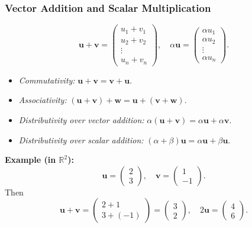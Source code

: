 \subsubsection{Vector Addition and Scalar Multiplication}
\[
\mathbf{u} + \mathbf{v} =
\begin{pmatrix}
u_1 + v_1 \\
u_2 + v_2 \\
\vdots \\
u_n + v_n
\end{pmatrix},
\quad
\alpha \mathbf{u} =
\begin{pmatrix}
\alpha u_1 \\
\alpha u_2 \\
\vdots \\
\alpha u_n
\end{pmatrix}.
\]
\begin{itemize}
\item \emph{Commutativity:} $\mathbf{u} + \mathbf{v} = \mathbf{v} + \mathbf{u}$.
\item \emph{Associativity:} $(\mathbf{u} + \mathbf{v}) + \mathbf{w} = \mathbf{u} + (\mathbf{v} + \mathbf{w})$.
\item \emph{Distributivity over vector addition:} $\alpha (\mathbf{u} + \mathbf{v}) = \alpha \mathbf{u} + \alpha \mathbf{v}$.
\item \emph{Distributivity over scalar addition:} $(\alpha + \beta)\mathbf{u} = \alpha \mathbf{u} + \beta \mathbf{u}$.
\end{itemize}

\noindent
\textbf{Example (in $\mathbb{R}^2$):}
\[
\mathbf{u} = \begin{pmatrix} 2 \\ 3 \end{pmatrix}, \quad
\mathbf{v} = \begin{pmatrix} 1 \\ -1 \end{pmatrix}.
\]
Then
\[
\mathbf{u} + \mathbf{v} 
= \begin{pmatrix} 2 + 1 \\ 3 + (-1) \end{pmatrix}
= \begin{pmatrix} 3 \\ 2 \end{pmatrix}, 
\quad
2\mathbf{u} 
= \begin{pmatrix} 4 \\ 6 \end{pmatrix}.
\]

